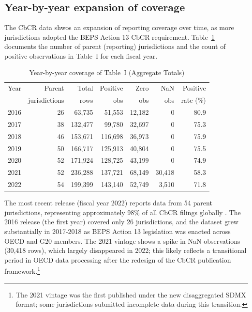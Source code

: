 \documentclass[11pt,a4paper]{article}
\begin{document}
\subsection{Year-by-year expansion of coverage}

The CbCR data shwos an expansion of reporting coverage over time, as more jurisdictions adopted the BEPS Action 13 CbCR requirement. Table~\ref{tab:yearcoverage} documents the number of parent (reporting) jurisdictions and the count of positive observations in Table~I for each fiscal year.

\begin{table}[H]
\centering
\caption{Year-by-year coverage of Table~I (Aggregate Totals)}
\label{tab:yearcoverage}
\begin{tabular}{@{}lrrrrrr@{}}
\toprule
Year & Parent & Total  & Positive & Zero & NaN & Positive \\
     & jurisdictions & rows & obs & obs & obs & rate (\%) \\
\midrule
2016 & 26 &  63,735 &  51,553 &  12,182 &      0 & 80.9 \\
2017 & 38 & 132,477 &  99,780 &  32,697 &      0 & 75.3 \\
2018 & 46 & 153,671 & 116,698 &  36,973 &      0 & 75.9 \\
2019 & 50 & 166,717 & 125,913 &  40,804 &      0 & 75.5 \\
2020 & 52 & 171,924 & 128,725 &  43,199 &      0 & 74.9 \\
2021 & 52 & 236,288 & 137,721 &  68,149 & 30,418 & 58.3 \\
2022 & 54 & 199,399 & 143,140 &  52,749 &  3,510 & 71.8 \\
\bottomrule
\end{tabular}
\end{table}

The most recent release (fiscal year 2022) reports data from 54 parent jurisdictions, representing approximately 98\% of all CbCR filings globally \citep{oecd2025corptaxstats}. The 2016 release (the first year) covered only 26 jurisdictions, and the dataset grew substantially in 2017-2018 as BEPS Action 13 legislation was enacted across OECD and G20 members. The 2021 vintage shows a spike in NaN observations (30,418 rows), which largely disappeared in
2022; this likely reflects a transitional period in OECD data processing after the
redesign of the CbCR publication framework.\footnote{The 2021 vintage was the
first published under the new disaggregated SDMX format; some jurisdictions
submitted incomplete data during this transition.}
\end{document}
